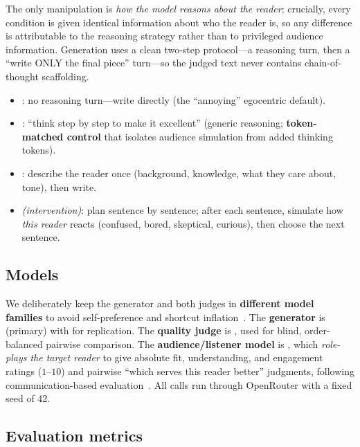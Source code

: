 The only manipulation is \emph{how the model reasons about the reader}; crucially, every
condition is given identical information about who the reader is, so any difference is
attributable to the reasoning strategy rather than to privileged audience information. Generation
uses a clean two-step protocol---a reasoning turn, then a ``write ONLY the final piece'' turn---so
the judged text never contains chain-of-thought scaffolding.

\begin{itemize}[leftmargin=*,itemsep=1pt,topsep=2pt]
    \item \plain: no reasoning turn---write directly (the ``annoying'' egocentric default).
    \item \cot: ``think step by step to make it excellent'' (generic reasoning;
    \textbf{token-matched control} that isolates audience simulation from added
    thinking tokens).
    \item \simtom: describe the reader once (background, knowledge, what they care about, tone),
    then write.
    \item \persentence \textit{(intervention)}: plan sentence by sentence; after each sentence,
    simulate how \emph{this reader} reacts (confused, bored, skeptical, curious), then choose the
    next sentence.
\end{itemize}

\subsection{Models}

We deliberately keep the generator and both judges in \textbf{different model families} to avoid
self-preference and shortcut inflation~\citep{shapira2023clever}. The \textbf{generator} is
\gptmini (primary) with \llama for replication. The \textbf{quality judge} is \claude, used for
blind, order-balanced pairwise comparison. The \textbf{audience/listener model} is \gemini, which
\emph{role-plays the target reader} to give absolute fit, understanding, and engagement ratings
($1$--$10$) and pairwise ``which serves this reader better'' judgments, following communication-based
evaluation~\citep{fried2023pragmatics}. All calls run through OpenRouter with a fixed seed of 42.

\subsection{Evaluation metrics}

